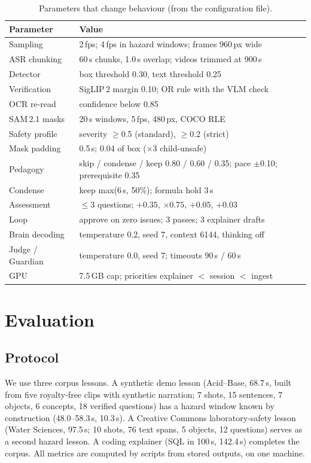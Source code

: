 \documentclass[conference,a4paper]{IEEEtran}
\begin{document}
\begin{table}[t]
\centering
\caption{Parameters that change behaviour (from the configuration file).}
\label{tab:params}
\footnotesize
\begin{tabular}{@{}L{2.2cm}L{5.4cm}@{}}
\toprule
Parameter & Value\\
\midrule
Sampling & 2\,fps; 4\,fps in hazard windows; frames 960\,px wide\\
ASR chunking & 60\,s chunks, 1.0\,s overlap; videos trimmed at 900\,s\\
Detector & box threshold 0.30, text threshold 0.25\\
Verification & SigLIP\,2 margin 0.10; OR rule with the VLM check\\
OCR re-read & confidence below 0.85\\
SAM\,2.1 masks & 20\,s windows, 5\,fps, 480\,px, COCO RLE\\
Safety profile & severity $\geq$0.5 (standard), $\geq$0.2 (strict)\\
Mask padding & 0.5\,s; 0.04 of box ($\times$3 child-unsafe)\\
Pedagogy & skip / condense / keep 0.80 / 0.60 / 0.35; pace $\pm$0.10; prerequisite 0.35\\
Condense & keep max(6\,s, 50\%); formula hold 3\,s\\
Assessment & $\leq$3 questions; $+0.35$, $\times0.75$, $+0.05$, $+0.03$\\
Loop & approve on zero issues; 3 passes; 3 explainer drafts\\
Brain decoding & temperature 0.2, seed 7, context 6144, thinking off\\
Judge / Guardian & temperature 0.0, seed 7; timeouts 90\,s / 60\,s\\
GPU & 7.5\,GB cap; priorities explainer $<$ session $<$ ingest\\
\bottomrule
\end{tabular}
\end{table}

\section{Evaluation}
\subsection{Protocol}
We use three corpus lessons. A synthetic demo lesson (Acid--Base, 68.7\,s, built from five royalty-free clips with
synthetic narration; 7 shots, 15 sentences, 7 objects, 6 concepts, 18 verified questions) has a hazard window known by
construction (48.0--58.3\,s, 10.3\,s). A Creative Commons laboratory-safety lesson (Water Sciences, 97.5\,s; 10 shots,
76 text spans, 5 objects, 12 questions) serves as a second hazard lesson. A coding explainer (SQL in 100\,s, 142.4\,s)
completes the corpus. All metrics are computed by scripts from stored outputs, on one machine.
\end{document}
